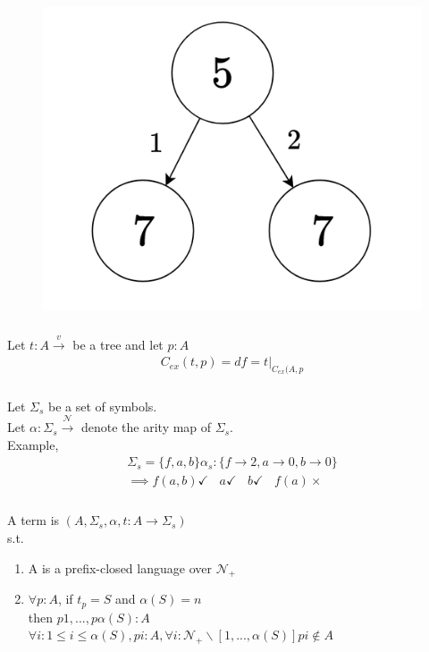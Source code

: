 \begin{figure}[htbp]
    \center
    \includegraphics[scale=0.6]{images/popl-4-3.png}
    \caption{}
\end{figure}

\subsubsection{}
Let $t:A\xrightarrow{v}$ be a tree and let $p:A$
\begin{gather}
    C_{ex}(t,p) = df = t \vert_{C_{ex}(A,p}
\end{gather}

\subsubsection{}
Let $\Sigma_{s}$ be a set of symbols.\\
Let $\alpha: \Sigma_{s} \xrightarrow{ \mathcal{N}}$ denote the arity map of $\Sigma_{s}$.\\

Example,\\
\begin{gather}
    \Sigma_{s} = \{f,a,b\}
    \alpha_{s}: \{f\xrightarrow{}2, a\xrightarrow{}0, b\xrightarrow{}0\}\\
    \implies f(a,b) \checkmark \ \ \ \ a \checkmark \ \ \ \ b \checkmark \ \ \ \ f(a) \times
\end{gather}

\subsubsection{}
A term is $(A,\Sigma_{s}, \alpha, t: A\xrightarrow{} \Sigma_{s})$\\
s.t.
\begin{enumerate}
    \item A is a prefix-closed language over $\mathcal{N}_{+}$
    \item $\forall p: A$, if $t_{p}=S$ and $\alpha(S)=n$\\
    then $p1,..., p\alpha(S): A$ \ \ \ \ \  \ \ \ 
    $\forall i: 1 \leq i \leq \alpha(S), pi: A, \forall i: \mathcal{N}_{+}\backslash[1,...,\alpha(S)]pi\notin A$
\end{enumerate}
